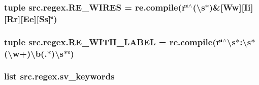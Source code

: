 \hypertarget{namespacesrc_1_1regex_a225957dab3c76d4d32070ee8333a65f1}{
\subsubsection[{R\-E\-\_\-\-W\-I\-R\-E\-S}]{\setlength{\rightskip}{0pt plus 5cm}tuple src.\-regex.\-R\-E\-\_\-\-W\-I\-R\-E\-S = re.\-compile(r\char`\"{}$^\wedge$(\textbackslash{}s$\ast$)\&\mbox{[}Ww\mbox{]}\mbox{[}Ii\mbox{]}\mbox{[}Rr\mbox{]}\mbox{[}Ee\mbox{]}\mbox{[}Ss\mbox{]}\char`\"{})}}\label{namespacesrc_1_1regex_a225957dab3c76d4d32070ee8333a65f1}
\hypertarget{namespacesrc_1_1regex_a19aabe8e63bfc26dfc686cf63bd2138b}{
\subsubsection[{R\-E\-\_\-\-W\-I\-T\-H\-\_\-\-L\-A\-B\-E\-L}]{\setlength{\rightskip}{0pt plus 5cm}tuple src.\-regex.\-R\-E\-\_\-\-W\-I\-T\-H\-\_\-\-L\-A\-B\-E\-L = re.\-compile(r\char`\"{}$^\wedge$\textbackslash{}s$\ast$\-:\textbackslash{}s$\ast$(\textbackslash{}w+)\textbackslash{}b(.$\ast$)\textbackslash{}s$\ast$\char`\"{})}}\label{namespacesrc_1_1regex_a19aabe8e63bfc26dfc686cf63bd2138b}
\hypertarget{namespacesrc_1_1regex_aafeb3af1bbb97ccdc0ddc3eefbd2e048}{
\subsubsection[{sv\-\_\-keywords}]{\setlength{\rightskip}{0pt plus 5cm}list src.\-regex.\-sv\-\_\-keywords}}\label{namespacesrc_1_1regex_aafeb3af1bbb97ccdc0ddc3eefbd2e048}
